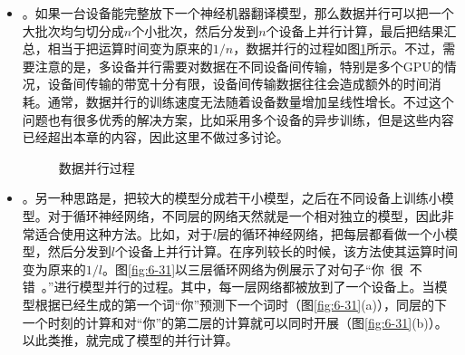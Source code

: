 \begin{itemize}
\vspace{0.5em}
\item {\small{}}。如果一台设备能完整放下一个神经机器翻译模型，那么数据并行可以把一个大批次均匀切分成$n$个小批次，然后分发到$n$个设备上并行计算，最后把结果汇总，相当于把运算时间变为原来的${1}/{n}$，数据并行的过程如图\ref{fig:6-30}所示。不过，需要注意的是，多设备并行需要对数据在不同设备间传输，特别是多个GPU的情况，设备间传输的带宽十分有限，设备间传输数据往往会造成额外的时间消耗\cite{xiao2017fast}。通常，数据并行的训练速度无法随着设备数量增加呈线性增长。不过这个问题也有很多优秀的解决方案，比如采用多个设备的异步训练，但是这些内容已经超出本章的内容，因此这里不做过多讨论。

\begin{figure}[htp]
\centering

\caption{数据并行过程}
\label{fig:6-30}
\end{figure}

\vspace{0.5em}
\item {\small{}}。另一种思路是，把较大的模型分成若干小模型，之后在不同设备上训练小模型。对于循环神经网络，不同层的网络天然就是一个相对独立的模型，因此非常适合使用这种方法。比如，对于$l$层的循环神经网络，把每层都看做一个小模型，然后分发到$l$个设备上并行计算。在序列较长的时候，该方法使其运算时间变为原来的${1}/{l}$。图\ref{fig:6-31}以三层循环网络为例展示了对句子``你\ 很\ 不错\ 。''进行模型并行的过程。其中，每一层网络都被放到了一个设备上。当模型根据已经生成的第一个词``你''预测下一个词时（图\ref{fig:6-31}(a)），同层的下一个时刻的计算和对``你''的第二层的计算就可以同时开展（图\ref{fig:6-31}(b)）。以此类推，就完成了模型的并行计算。
\vspace{0.5em}
\end{itemize}

